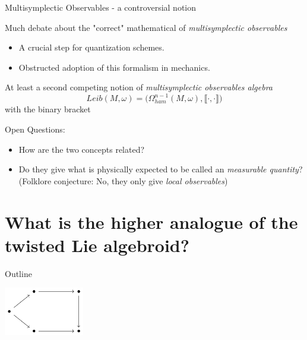 \documentclass[10pt]{beamer}
\renewcommand{\checkpoint}[0]{
	\setcounter{tocdepth}{1}
	\addtocounter{framenumber}{-1}
 	\begin{frame}[t]{Outline}
  		\tableofcontents[currentsection]
		\begin{center}
			\includegraphics[width=3.5cm]{Pictures/Figure_pentagondiagm_page}
		\end{center}
	\end{frame}
}
\begin{document}
\begin{frame}{Multisymplectic Observables - a controversial notion}
	\begin{block}{ Much debate about the "correct" mathematical of \emph{multisymplectic observables}}
		\begin{itemize}
			\item A crucial step for quantization schemes.
			\item Obstructed adoption of this formalism in mechanics.
		\end{itemize}	
	\end{block}		
	\vspace{1.5em} \pause
	\begin{block}{ At least a second competing notion of \emph{multisymplectic observables algebra}}
		\begin{displaymath}
			Leib(M,\omega) = \Big( \Omega_{ham}^{n-1}(M,\omega), \llbracket\cdot,\cdot\rrbracket \Big)
		\end{displaymath}
		with the binary bracket 
		\begin{center}
				
		\end{center}
	\end{block}	
	\vspace{1em} \pause
	\begin{block}{Open Questions:}
		\begin{itemize}
			\item How are the two concepts related?
			\item Do they give what is physically expected to be called an \emph{measurable quantity}?
				\\
				(Folklore conjecture: No, they only give \emph{local observables})				
		\end{itemize}
	\end{block}
\end{frame}


\section{What is the \textbf{higher analogue} of the \textbf{twisted Lie algebroid}?}
\checkpoint	
\end{document}
